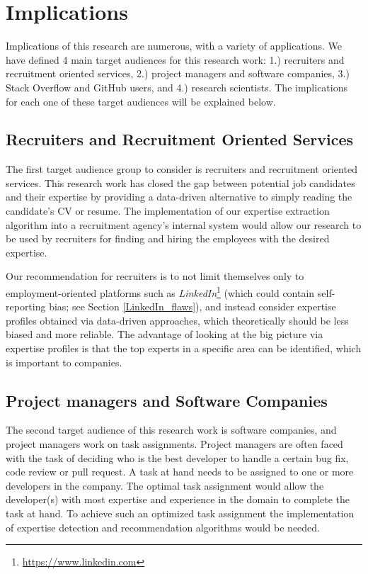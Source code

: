     \section{Implications\label{sec:implications}}
    
        Implications of this research are numerous, with a variety of applications. We have defined 4 main target audiences for this research work: 1.) recruiters and recruitment oriented services, 2.) project managers and software companies, 3.) Stack Overflow and GitHub users, and 4.) research scientists. The implications for each one of these target audiences will be explained below. 
        
        \subsection{Recruiters and Recruitment Oriented Services}
        
            The first target audience group to consider is recruiters and recruitment oriented services. This research work has closed the gap between potential job candidates and their expertise by providing a data-driven alternative to simply reading the candidate's CV or resume. The implementation of our expertise extraction algorithm into a recruitment agency's internal system would allow our research to be used by recruiters for finding and hiring the employees with the desired expertise. 
            
            Our recommendation for recruiters is to not limit themselves only to employment-oriented platforms such as \emph{LinkedIn}\footnote{\url{https://www.linkedin.com}} (which could contain self-reporting bias; see Section \ref{LinkedIn_flaws}), and instead consider expertise profiles obtained via data-driven approaches, which theoretically should be less biased and more reliable. The advantage of looking at the big picture via expertise profiles is that the top experts in a specific area can be identified, which is important to companies.
            
        \subsection{Project managers and Software Companies}
        
            The second target audience of this research work is software companies, and project managers work on task assignments. Project managers are often faced with the task of deciding who is the best developer to handle a certain bug fix, code review or pull request. A task at hand needs to be assigned to one or more developers in the company. The optimal task assignment would allow the developer(s) with most expertise and experience in the domain to complete the task at hand. To achieve such an optimized task assignment the implementation of expertise detection and recommendation algorithms would be needed. 
            
